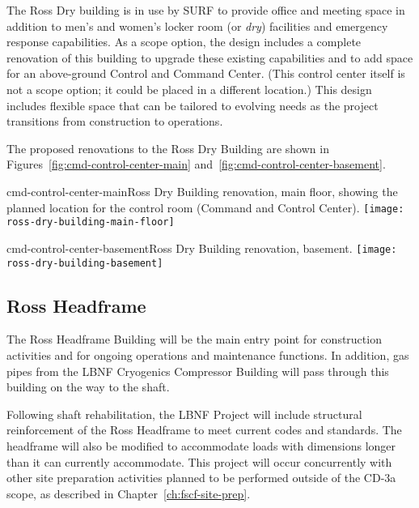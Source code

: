 The Ross Dry building is in use by SURF to provide office and meeting space in addition to men's and women's locker room (or \textit{dry}) facilities and emergency response capabilities. As a scope option, the design includes a complete renovation of this building to upgrade these existing capabilities and to add space for an above-ground Control and Command Center.  (This control center itself is not a scope option; it could be placed in a different location.)  This design includes flexible space that can be tailored to %
evolving needs as the project transitions from construction to operations. 

The proposed renovations to the Ross Dry Building are shown in Figures~\ref{fig:cmd-control-center-main} and~\ref{fig:cmd-control-center-basement}.

\begin{cdrfigure}{cmd-control-center-main}{Ross Dry Building renovation, main floor, showing the planned location for the control room (Command and Control Center). %
}
\texttt{[image: ross-dry-building-main-floor]}
\end{cdrfigure}

\begin{cdrfigure}{cmd-control-center-basement}{Ross Dry  Building renovation, basement.}
\texttt{[image: ross-dry-building-basement]}
\end{cdrfigure}


\subsection{Ross Headframe}
\label{sec:fscf-surf-facil-surface-bldg-rosshead}

The Ross Headframe Building will be the main entry point for construction activities and for ongoing operations and maintenance functions. In addition, gas pipes from the LBNF Cryogenics Compressor Building will pass through this building on the way to the shaft.

Following shaft rehabilitation, the LBNF Project will include structural reinforcement of the Ross Headframe to meet current codes and standards.  The headframe will also be modified %
to accommodate loads with dimensions longer than it can currently accommodate.  This project will occur concurrently with other site preparation activities planned to be performed outside of the CD-3a scope, as described in Chapter~\ref{ch:fscf-site-prep}.


